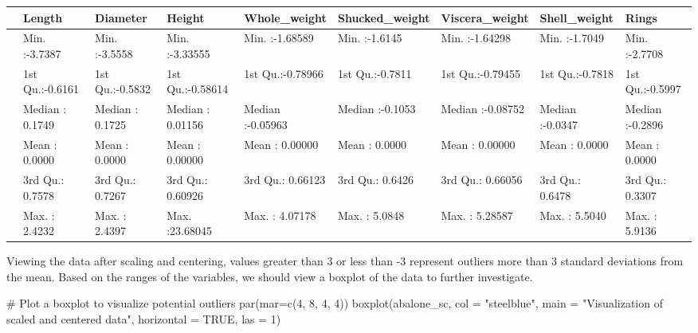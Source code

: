 \documentclass[
  letterpaper,
  DIV=11,
  numbers=noendperiod]{scrreprt}
\newenvironment{Shaded}{\begin{snugshade}}{\end{snugshade}}
\newcommand{\AttributeTok}[1]{\textcolor[rgb]{0.40,0.45,0.13}{#1}}
\newcommand{\CommentTok}[1]{\textcolor[rgb]{0.37,0.37,0.37}{#1}}
\newcommand{\ConstantTok}[1]{\textcolor[rgb]{0.56,0.35,0.01}{#1}}
\newcommand{\DecValTok}[1]{\textcolor[rgb]{0.68,0.00,0.00}{#1}}
\newcommand{\FunctionTok}[1]{\textcolor[rgb]{0.28,0.35,0.67}{#1}}
\newcommand{\NormalTok}[1]{\textcolor[rgb]{0.00,0.23,0.31}{#1}}
\newcommand{\StringTok}[1]{\textcolor[rgb]{0.13,0.47,0.30}{#1}}
\begin{document}
\begin{table}
\centering
\begin{tabular}[t]{l|l|l|l|l|l|l|l|l}
\hline
  &     Length &    Diameter &     Height &  Whole\_weight & Shucked\_weight & Viscera\_weight &  Shell\_weight &     Rings\\
\hline
 & Min.   :-3.7387 & Min.   :-3.5558 & Min.   :-3.33555 & Min.   :-1.68589 & Min.   :-1.6145 & Min.   :-1.64298 & Min.   :-1.7049 & Min.   :-2.7708\\
\hline
 & 1st Qu.:-0.6161 & 1st Qu.:-0.5832 & 1st Qu.:-0.58614 & 1st Qu.:-0.78966 & 1st Qu.:-0.7811 & 1st Qu.:-0.79455 & 1st Qu.:-0.7818 & 1st Qu.:-0.5997\\
\hline
 & Median : 0.1749 & Median : 0.1725 & Median : 0.01156 & Median :-0.05963 & Median :-0.1053 & Median :-0.08752 & Median :-0.0347 & Median :-0.2896\\
\hline
 & Mean   : 0.0000 & Mean   : 0.0000 & Mean   : 0.00000 & Mean   : 0.00000 & Mean   : 0.0000 & Mean   : 0.00000 & Mean   : 0.0000 & Mean   : 0.0000\\
\hline
 & 3rd Qu.: 0.7578 & 3rd Qu.: 0.7267 & 3rd Qu.: 0.60926 & 3rd Qu.: 0.66123 & 3rd Qu.: 0.6426 & 3rd Qu.: 0.66056 & 3rd Qu.: 0.6478 & 3rd Qu.: 0.3307\\
\hline
 & Max.   : 2.4232 & Max.   : 2.4397 & Max.   :23.68045 & Max.   : 4.07178 & Max.   : 5.0848 & Max.   : 5.28587 & Max.   : 5.5040 & Max.   : 5.9136\\
\hline
\end{tabular}
\end{table}

Viewing the data after scaling and centering, values greater than 3 or
less than -3 represent outliers more than 3 standard deviations from the
mean. Based on the ranges of the variables, we should view a boxplot of
the data to further investigate.

\begin{Shaded}
\begin{Highlighting}[]
\CommentTok{\# Plot a boxplot to visualize potential outliers}
\FunctionTok{par}\NormalTok{(}\AttributeTok{mar=}\FunctionTok{c}\NormalTok{(}\DecValTok{4}\NormalTok{, }\DecValTok{8}\NormalTok{, }\DecValTok{4}\NormalTok{, }\DecValTok{4}\NormalTok{))}
\FunctionTok{boxplot}\NormalTok{(abalone\_sc, }\AttributeTok{col =} \StringTok{"steelblue"}\NormalTok{, }\AttributeTok{main =} \StringTok{"Visualization of scaled and centered data"}\NormalTok{, }\AttributeTok{horizontal =} \ConstantTok{TRUE}\NormalTok{, }\AttributeTok{las =} \DecValTok{1}\NormalTok{)}
\end{Highlighting}
\end{Shaded}
\end{document}
